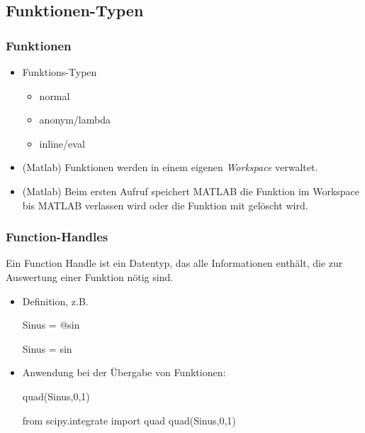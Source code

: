 \documentclass[hyperref={xetex}]{beamer}
\begin{document}
\subsection{Funktionen-Typen}
%
%
\begin{frame}[fragile]\frametitle{Funktionen}
\begin{itemize}
 \item Funktions-Typen
\begin{itemize}
\item normal
\item anonym/lambda
\item inline/eval
\end{itemize}
\item (Matlab) Funktionen werden in einem eigenen {\it Workspace} verwaltet.
\item (Matlab) Beim ersten Aufruf speichert MATLAB die Funktion im Workspace bis MATLAB
  verlassen wird oder die Funktion  mit   gel\"oscht wird.
\end{itemize}
\end{frame}

%
%
\begin{frame}[fragile]\frametitle{Function-Handles}

Ein \alert{Function Handle} ist ein Datentyp, das alle Informationen
enth\"alt, die zur Auswertung einer Funktion n\"otig sind.\\
\begin{itemize}
\item Definition, z.B. 
\begin{matlabin}
Sinus = @sin 
\end{matlabin}
\begin{pyin}
Sinus = sin
\end{pyin}
\item Anwendung bei der \"Ubergabe von Funktionen:
\begin{matlabin}
quad(Sinus,0,1)
\end{matlabin}
\begin{pyin}
from scipy.integrate import quad
quad(Sinus,0,1)  
\end{pyin}
\end{itemize}
\end{frame}
\end{document}
